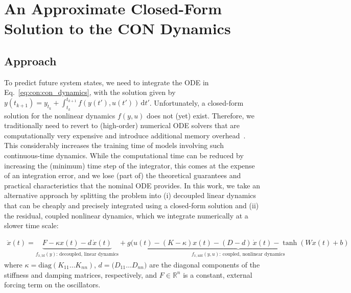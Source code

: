 \section{An Approximate Closed-Form Solution to the CON Dynamics}

\subsection{Approach}\label{sub:con:cfa:approach}
To predict future system states, we need to integrate the ODE in Eq.~\eqref{eq:con:con_dynamics}, with the solution given by $y(t_{k+1}) = y_{t_k} + \int_{t_k}^{t_{k+1}} f(y(t'), u(t')) \, \mathrm{d}t'$.
Unfortunately, a closed-form solution for the nonlinear dynamics $f(y, u)$ does not (yet) exist. Therefore, we traditionally need to revert to (high-order) numerical \gls{ODE} solvers that are computationally very expensive and introduce additional memory overhead~\citep{kidger2021neural}. This considerably increases the training time of models involving such continuous-time dynamics.
While the computational time can be reduced by increasing the (minimum) time step of the integrator, this comes at the expense of an integration error, and we lose (part of) the theoretical guarantees and practical characteristics that the nominal \gls{ODE} provides.
In this work, we take an alternative approach by splitting the problem into (i) decoupled linear dynamics that can be cheaply and precisely integrated using a closed-form solution and (ii) the residual, coupled nonlinear dynamics, which we integrate numerically at a slower time scale:

\begin{equation}\label{eq:con:con_split_linear_terms}
\begin{split}
    \ddot{x}(t) = \underbrace{F -\kappa x(t) - d \, \dot{x}(t)}_{f_{\ddot{x}, \mathrm{ld}}(y): \, \text{decoupled, linear dynamics}} + \underbrace{g(u(t)-(K-\kappa) x(t) - (D-d) \, \dot{x}(t) - \tanh(W x(t) + b)}_{f_{\ddot{x}, \mathrm{nld}}(y, u): \: \text{coupled, nonlinear dynamics}}
\end{split}
\end{equation}
where $\kappa = \mathrm{diag}(K_{11} \dots K_{nn})$, $d = \mathrm(D_{11} \dots D_{nn})$ are the diagonal components of the stiffness and damping matrices, respectively, and $F \in \mathbb{R}^{n}$ is a constant, external forcing term on the oscillators.

